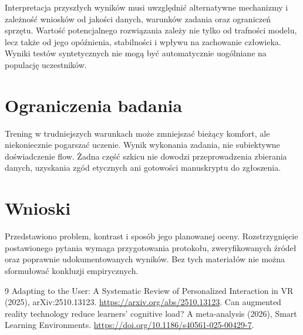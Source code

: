 \documentclass[11pt,a4paper]{article}
\begin{document}
Interpretacja przyszłych wyników musi uwzględnić alternatywne mechanizmy i zależność wniosków od jakości danych, warunków zadania oraz ograniczeń sprzętu. Wartość potencjalnego rozwiązania zależy nie tylko od trafności modelu, lecz także od jego opóźnienia, stabilności i wpływu na zachowanie człowieka. Wyniki testów syntetycznych nie mogą być automatycznie uogólniane na populację uczestników.

\section{Ograniczenia badania}

Trening w trudniejszych warunkach może zmniejszać bieżący komfort, ale niekoniecznie pogarszać uczenie. Wynik wykonania zadania, nie subiektywne doświadczenie flow. Żadna część szkicu nie dowodzi przeprowadzenia zbierania danych, uzyskania zgód etycznych ani gotowości manuskryptu do zgłoszenia.

\section{Wnioski}

Przedstawiono problem, kontrast i sposób jego planowanej oceny. Rozstrzygnięcie postawionego pytania wymaga przygotowania protokołu, zweryfikowanych źródeł oraz poprawnie udokumentowanych wyników. Bez tych materiałów nie można sformułować konkluzji empirycznych.

\begin{thebibliography}{9}
 Adapting to the User: A Systematic Review of Personalized Interaction in VR (2025), arXiv:2510.13123. \url{https://arxiv.org/abs/2510.13123}.
 Can augmented reality technology reduce learners' cognitive load? A meta-analysis (2026), Smart Learning Environments. \url{https://doi.org/10.1186/s40561-025-00429-7}.
\end{thebibliography}
\end{document}

